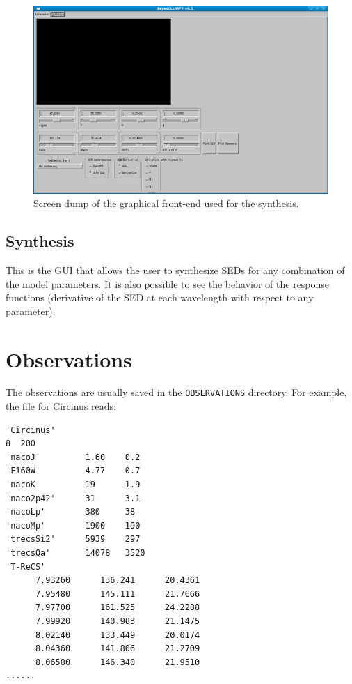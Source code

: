 \documentclass[12pt]{article}
\begin{document}
\begin{figure}[!t]
\includegraphics[scale=0.5]{snapshot2.png}
\caption{Screen dump of the graphical front-end used for the synthesis.
\label{fig:synthesis_GUI}}
\end{figure}

\subsection{Synthesis}
This is the GUI that allows the user to synthesize SEDs for any combination of the model
parameters. It is also possible to see the behavior of the response functions (derivative
of the SED at each wavelength with respect to any parameter).

\section{Observations}
\label{sec:observations}
The observations are usually saved in the \texttt{OBSERVATIONS} directory. For example, the
file for Circinus reads:
\begin{verbatim}
'Circinus'
8  200
'nacoJ'         1.60    0.2     
'F160W'         4.77    0.7     
'nacoK'         19      1.9     
'naco2p42'      31      3.1     
'nacoLp'        380     38      
'nacoMp'        1900    190     
'trecsSi2'      5939    297     
'trecsQa'       14078   3520
'T-ReCS'
      7.93260      136.241      20.4361
      7.95480      145.111      21.7666
      7.97700      161.525      24.2288
      7.99920      140.983      21.1475
      8.02140      133.449      20.0174
      8.04360      141.806      21.2709
      8.06580      146.340      21.9510
......
\end{verbatim}
\end{document}
